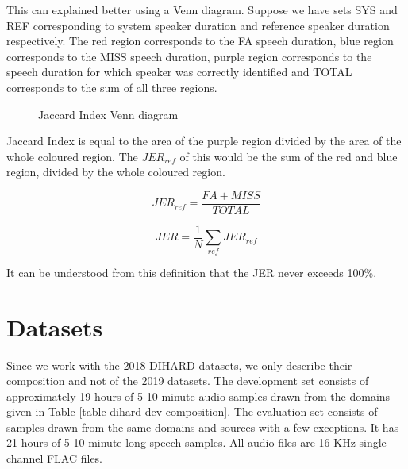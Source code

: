 	This can explained better using a Venn diagram. Suppose we have sets SYS and REF corresponding to system speaker duration and reference speaker duration respectively. The red region corresponds to the FA speech duration, blue region corresponds to the MISS speech duration, purple region corresponds to the speech duration for which speaker was correctly identified and TOTAL corresponds to the sum of all three regions.
	
	\begin{figure}[h]
		\centering
		\def\syscircle{(0,0) circle (1.5cm)}
		\def\refcircle{(0:2cm) circle (1.5cm)}
		\caption{Jaccard Index Venn diagram}
	\end{figure}
	
	Jaccard Index is equal to the area of the purple region divided by the area of the whole coloured region. The $JER_{ref}$ of this would be the sum of the red and blue region, divided by the whole coloured region.
	
	$$ JER_{ref} = \frac{FA + MISS}{TOTAL} $$
	
	$$ JER = \frac{1}{N}\sum_{ref}JER_{ref} $$
	
	It can be understood from this definition that the JER never exceeds 100\%.
	
\section{Datasets}
Since we work with the 2018 DIHARD datasets, we only describe their composition and not of the 2019 datasets. The development set consists of approximately 19 hours of 5-10 minute audio samples drawn from the domains given in Table \ref{table-dihard-dev-composition}. The evaluation set consists of samples drawn from the same domains and sources with a few exceptions. It has 21 hours of 5-10 minute long speech samples. All audio files are 16 KHz single channel FLAC files.

